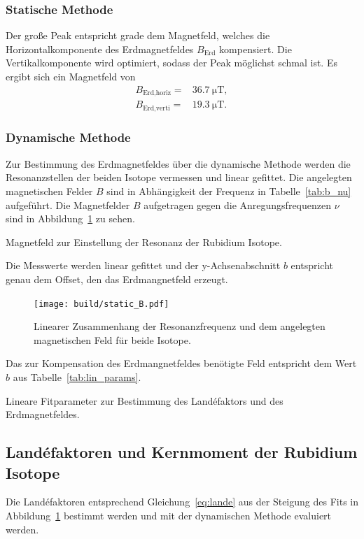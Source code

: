\subsubsection{Statische Methode}%
\label{ssub:subsubsection_name}
Der große Peak entspricht grade dem Magnetfeld, welches die Horizontalkomponente
des Erdmagnetfeldes $B_\text{Erd}$ kompensiert.
Die Vertikalkomponente wird optimiert, sodass der Peak möglichst schmal ist.
Es ergibt sich ein Magnetfeld von
\begin{eqnarray}
	B_\text{Erd,horiz} =& \SI{36.7}{\micro\tesla}, \\
	B_\text{Erd,verti} =& \SI{19.3}{\micro\tesla}.
\end{eqnarray}

\subsubsection{Dynamische Methode}%
\label{ssub:dynamische_methode}
Zur Bestimmung des Erdmagnetfeldes über die dynamische Methode werden die
Resonanzstellen der beiden Isotope vermessen und linear gefittet.
Die angelegten magnetischen Felder $B$ sind in Abhängigkeit der Frequenz in
Tabelle~\ref{tab:b_nu} aufgeführt.
Die Magnetfelder $B$ aufgetragen gegen die Anregungsfrequenzen $\nu$ sind in
Abbildung~\ref{fig:static_B} zu sehen.
\begin{table}[h]
	\centering
	\caption{Magnetfeld zur Einstellung der Resonanz der Rubidium Isotope.}%
	\label{tab:b_nu}
		
\end{table}
Die Messwerte werden linear gefittet und der y-Achsenabschnitt $b$
entspricht genau dem Offset, den das Erdmangnetfeld erzeugt.
\begin{figure}[h]
	\centering
	\texttt{[image: build/static\_B.pdf]}
	\caption{Linearer Zusammenhang der Resonanzfrequenz und dem angelegten
	magnetischen Feld für beide Isotope.}%
	\label{fig:static_B}
\end{figure}
Das zur Kompensation des Erdmangnetfeldes benötigte Feld entspricht dem Wert $b$ aus
Tabelle~\ref{tab:lin_params}.
\begin{table}[h]
	\centering
	\caption{Lineare Fitparameter zur Bestimmung des Land\'efaktors und des
	Erdmagnetfeldes.}%
	\label{tab:lin_params}
	
\end{table}
\subsection{Land\'efaktoren und Kernmoment der Rubidium Isotope}%
\label{sub:landefaktoren_der_rubidium_isotope}
Die Land\'efaktoren entsprechend Gleichung~\ref{eq:lande} aus der Steigung
des Fits in Abbildung~\ref{fig:static_B} bestimmt werden und mit der dynamischen
Methode evaluiert werden.
